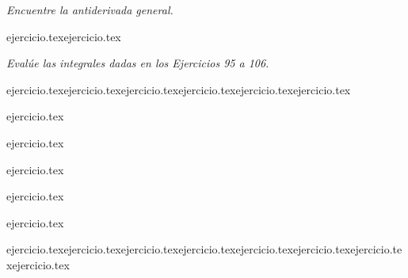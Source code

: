 \vspace{1em}
\noindent \textit{Encuentre la antiderivada general.}

\begin{enumerate}
    \setcounter{enumi}{92}
    {ejercicio.tex}{ejercicio.tex}\end{enumerate}

\vspace{1em}
\noindent \textit{Evalúe las integrales dadas en los Ejercicios 95 a 106.}

\begin{enumerate}
    \setcounter{enumi}{94}
    \begin{minipage}{0.3\textwidth}
    {ejercicio.tex}{ejercicio.tex}{ejercicio.tex}{ejercicio.tex}{ejercicio.tex}{ejercicio.tex}\end{minipage}%
    \begin{minipage}{0.3\textwidth}
    \setcounter{enumi}{95}
    {ejercicio.tex}\addtocounter{enumi}{1}
    {ejercicio.tex}\addtocounter{enumi}{1}
    {ejercicio.tex}\addtocounter{enumi}{1}
    {ejercicio.tex}\addtocounter{enumi}{1}
    {ejercicio.tex}\end{minipage}
\end{enumerate}

\vspace{1em}
\begin{enumerate}
    \setcounter{enumi}{106}
    {ejercicio.tex}{ejercicio.tex}{ejercicio.tex}{ejercicio.tex}{ejercicio.tex}{ejercicio.tex}{ejercicio.tex}{ejercicio.tex}\end{enumerate}